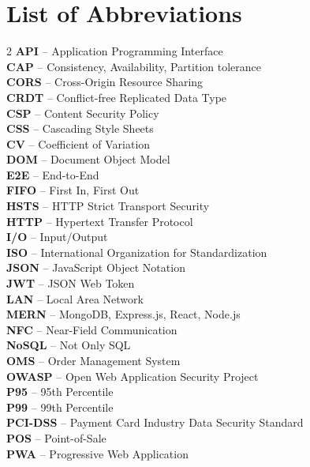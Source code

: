 \chapter*{List of Abbreviations}

\small
\begin{multicols}{2}
\noindent
\textbf{API} -- Application Programming Interface \\
\textbf{CAP} -- Consistency, Availability, Partition tolerance \\
\textbf{CORS} -- Cross-Origin Resource Sharing \\
\textbf{CRDT} -- Conflict-free Replicated Data Type \\
\textbf{CSP} -- Content Security Policy \\
\textbf{CSS} -- Cascading Style Sheets \\
\textbf{CV} -- Coefficient of Variation \\
\textbf{DOM} -- Document Object Model \\
\textbf{E2E} -- End-to-End \\
\textbf{FIFO} -- First In, First Out \\
\textbf{HSTS} -- HTTP Strict Transport Security \\
\textbf{HTTP} -- Hypertext Transfer Protocol \\
\textbf{I/O} -- Input/Output \\
\textbf{ISO} -- International Organization for Standardization \\
\textbf{JSON} -- JavaScript Object Notation \\
\textbf{JWT} -- JSON Web Token \\
\textbf{LAN} -- Local Area Network \\
\textbf{MERN} -- MongoDB, Express.js, React, Node.js \\
\textbf{NFC} -- Near-Field Communication \\
\textbf{NoSQL} -- Not Only SQL \\
\textbf{OMS} -- Order Management System \\
\textbf{OWASP} -- Open Web Application Security Project \\
\textbf{P95} -- 95th Percentile \\
\textbf{P99} -- 99th Percentile \\
\textbf{PCI-DSS} -- Payment Card Industry Data Security Standard \\
\textbf{POS} -- Point-of-Sale \\
\textbf{PWA} -- Progressive Web Application \\

\end{multicols}
